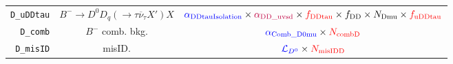 \begin{landscape}
\begin{table}
\begin{tabular}{r|c|c}
       \texttt{D\_uDDtau} &        $B^- \rightarrow D^0 D_q (\rightarrow \tau \overline{\nu}_\tau X') X$         &                                                                            $\textcolor{blue}{\alpha_\text{DDtauIsolation}} \times \textcolor{purple}{\alpha_\text{DD\_uvsd}} \times \textcolor{red}{f_\text{DDtau}} \times f_\text{DD} \times N_\text{Dmu} \times \textcolor{red}{f_\text{uDDtau}}$                                                                            \\
         \texttt{D\_comb} &                                   $B^-$ comb. bkg.                                   &                                                                                                                                              $\textcolor{blue}{\alpha_\text{Comb\_D0mu}} \times \textcolor{red}{N_\text{combD}}$                                                                                                                                               \\
        \texttt{D\_misID} &                                        misID.                                        &                                                                                                                                                 $\textcolor{blue}{\mathcal{L}_{D^0}} \times \textcolor{red}{N_\text{misIDD}}$                                                                                                                                                  \\
\bottomrule
\end{tabular}

\end{table}
\end{landscape}
\restoregeometry


